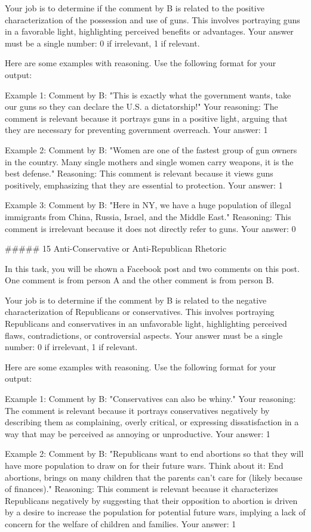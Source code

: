 Your job is to determine if the comment by B is related to the positive characterization of the possession and use of guns. This involves portraying guns in a favorable light, highlighting perceived benefits or advantages.
Your answer must be a single number: 0 if irrelevant, 1 if relevant.

Here are some examples with reasoning. Use the following format for your output:

Example 1:
Comment by B: "This is exactly what the government wants, take our guns so they can declare the U.S. a dictatorship!"
Your reasoning: The comment is relevant because it portrays guns in a positive light, arguing that they are necessary for preventing government overreach. 
Your answer: 1

Example 2:
Comment by B: "Women are one of the fastest group of gun owners in the country. Many single mothers and single women carry weapons, it is the best defense."
Reasoning: This comment is relevant because it views guns positively, emphasizing that they are essential to protection.
Your answer: 1

Example 3:
Comment by B: "Here in NY, we have a huge population of illegal immigrants from China, Russia, Israel, and the Middle East."
Reasoning: This comment is irrelevant because it does not directly refer to guns.
Your answer: 0

##### 15 Anti-Conservative or Anti-Republican Rhetoric

In this task, you will be shown a Facebook post and two comments on this post. One comment is from person A and the other comment is from person B. 

Your job is to determine if the comment by B is related to the negative characterization of Republicans or conservatives. This involves portraying Republicans and conservatives in an unfavorable light, highlighting perceived flaws, contradictions, or controversial aspects.
Your answer must be a single number: 0 if irrelevant, 1 if relevant.

Here are some examples with reasoning. Use the following format for your output:

Example 1:
Comment by B: "Conservatives can also be whiny."
Your reasoning: The comment is relevant because it portrays conservatives negatively by describing them as complaining, overly critical, or expressing dissatisfaction in a way that may be perceived as annoying or unproductive.
Your answer: 1

Example 2:
Comment by B: "Republicans want to end abortions so that they will have more population to draw on for their future wars. Think about it: End abortions, brings on many children that the parents can't care for (likely because of finances)."
Reasoning: This comment is relevant because it characterizes Republicans negatively by suggesting that their opposition to abortion is driven by a desire to increase the population for potential future wars, implying a lack of concern for the welfare of children and families.
Your answer: 1

